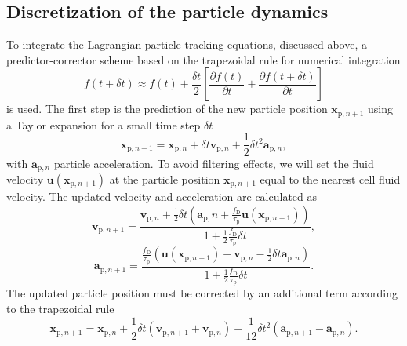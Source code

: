 \documentclass[11pt,a4paper,openany,oneside,parskip=half*]{article}
\renewcommand*\vec[1]{\boldsymbol{#1}}
\begin{document}
\subsection{Discretization of the particle dynamics}
To integrate the Lagrangian particle tracking equations, discussed above, a predictor-corrector scheme based on the trapezoidal rule for numerical integration
\begin{equation}
f (t + \delta t) \approx f(t) + \frac{\delta t}{2} \left[ \frac{\partial f(t)}{\partial t} + \frac{\partial f(t + \delta t)}{\partial t} \right ]
\end{equation}
is used.
\newline
The first step is the prediction of the new particle position $\vec{x}_{\mathrm{p}, n+1}$ using a Taylor expansion for a small time step $\delta t$
\begin{equation}
\vec{x}_{\mathrm{p}, n+1} = \vec{x}_{\mathrm{p}, n} + \delta t \vec{v}_{\mathrm{p}, n} + \frac{1}{2} \delta t^2 \vec{a}_{\mathrm{p}, n},
\end{equation}
with $\vec{a}_{\mathrm{p}, n}$ particle acceleration. %
\newline
To avoid filtering effects, we will set the fluid velocity $\vec{u}(\vec{x}_{\mathrm{p}, n+1})$ at the particle position $\vec{x}_{\mathrm{p}, n+1}$ equal to the nearest cell fluid velocity. %
\newline
The updated velocity and acceleration are calculated as
\begin{equation}
\vec{v}_{\mathrm{p}, n+1} = \frac{\vec{v}_{\mathrm{p}, n} + \frac{1}{2} \delta t \left(\vec{a}_{\mathrm{p}, }n + \frac{f_\mathrm{D}}{\tau_\mathrm{p}}\vec{u}(\vec{x}_{\mathrm{p}, n+1}) \right)}{1 + \frac{1}{2} \frac{f_\mathrm{D}}{\tau_\mathrm{p}} \delta t},
\end{equation}
\begin{equation}
\vec{a}_{\mathrm{p}, n+1} = \frac{\frac{f_\mathrm{D}}{\tau_\mathrm{p}} \left(\vec{u}(\vec{x}_{\mathrm{p}, n+1}) - \vec{v}_{\mathrm{p}, n} - \frac{1}{2} \delta t \vec{a}_{\mathrm{p}, n} \right)}{1 + \frac{1}{2} \frac{f_\mathrm{D}}{\tau_\mathrm{p}} \delta t}.
\end{equation}
The updated particle position must be corrected by an additional term according to the trapezoidal rule
\begin{equation}
\vec{x}_{\mathrm{p}, n+1} = \vec{x}_{\mathrm{p}, n} + \frac{1}{2} \delta t \left( \vec{v}_{\mathrm{p}, n+1} + \vec{v}_{\mathrm{p}, n} \right) + \frac{1}{12} \delta t^2 \left( \vec{a}_{\mathrm{p}, n+1} - \vec{a}_{\mathrm{p}, n} \right).
\end{equation}
\end{document}
